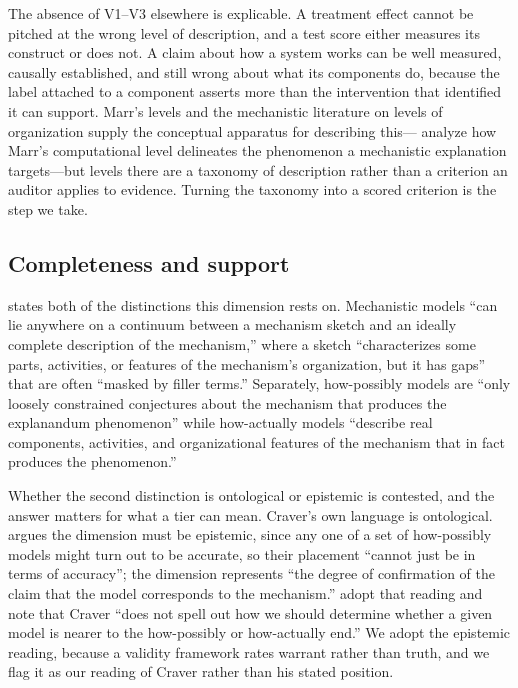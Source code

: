 \documentclass{article}
\begin{document}
The absence of V1--V3 elsewhere is explicable. A treatment effect cannot be pitched at the wrong level of description, and a test score either measures its construct or does not. A claim about how a system works can be well measured, causally established, and still wrong about what its components do, because the label attached to a component asserts more than the intervention that identified it can support. Marr's levels and the mechanistic literature on levels of organization supply the conceptual apparatus for describing this---\citet{shagrir2017marr} analyze how Marr's computational level delineates the phenomenon a mechanistic explanation targets---but levels there are a taxonomy of description rather than a criterion an auditor applies to evidence. Turning the taxonomy into a scored criterion is the step we take.

\subsection{Completeness and support}
\label{sec:related-completeness}

\citet{craver2006when} states both of the distinctions this dimension rests on. Mechanistic models ``can lie anywhere on a continuum between a mechanism sketch and an ideally complete description of the mechanism,'' where a sketch ``characterizes some parts, activities, or features of the mechanism's organization, but it has gaps'' that are often ``masked by filler terms.'' Separately, how-possibly models are ``only loosely constrained conjectures about the mechanism that produces the explanandum phenomenon'' while how-actually models ``describe real components, activities, and organizational features of the mechanism that in fact produces the phenomenon.''

Whether the second distinction is ontological or epistemic is contested, and the answer matters for what a tier can mean. Craver's own language is ontological. \citet{weiskopf2011models} argues the dimension must be epistemic, since any one of a set of how-possibly models might turn out to be accurate, so their placement ``cannot just be in terms of accuracy''; the dimension represents ``the degree of confirmation of the claim that the model corresponds to the mechanism.'' \citet{colombo2015models} adopt that reading and note that Craver ``does not spell out how we should determine whether a given model is nearer to the how-possibly or how-actually end.'' We adopt the epistemic reading, because a validity framework rates warrant rather than truth, and we flag it as our reading of Craver rather than his stated position.
\end{document}
